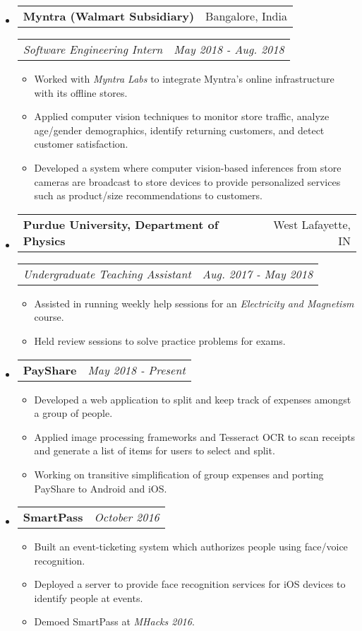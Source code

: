 \documentclass[letterpaper, 11pt]{article}
\makeatletter
\newcommand{\resitem}[1]{\item #1 \vspace{-2pt}}
\newcommand{\resheading}[1]{{\large \parashade[.9]{sharpcorners}{\textbf{#1 \vphantom{p\^{E}}}}}}
\newcommand{\ressubheadinga}[2]{
\begin{tabular*}{7.11in}{l@{\extracolsep{\fill}}r}
		\textbf{#1} & #2 \\
\end{tabular*}}
\newcommand{\ressubheadingb}[2]{
\begin{tabular*}{7.11in}{l@{\extracolsep{\fill}}r}
		\textit{#1} & \textit{#2} \\
\end{tabular*}\vspace{-6pt}}
\makeatother
\begin{document}
\begin{itemize}
\item
	\ressubheadinga{Myntra (Walmart Subsidiary)}{Bangalore, India}
	\ressubheadingb{Software Engineering Intern}{May 2018 - Aug. 2018}
	\begin{itemize}
        \resitem{Worked with \emph{Myntra Labs} to integrate Myntra's online infrastructure with its offline stores.}
		\resitem{Applied computer vision techniques to monitor store traffic, analyze age/gender demographics, identify returning customers, and detect customer satisfaction.}
		\resitem{Developed a system where computer vision-based inferences from store cameras are broadcast to store devices to provide personalized services such as product/size recommendations to customers.}
	\end{itemize}
\end{itemize}

\begin{itemize}
\item
    \ressubheadinga{Purdue University, Department of Physics}{West Lafayette, IN}
    \ressubheadingb{Undergraduate Teaching Assistant}{Aug. 2017 - May 2018}
    \begin{itemize}
        \resitem{Assisted in running weekly help sessions for an \textit{Electricity and Magnetism} course.}
        \resitem{Held review sessions to solve practice problems for exams.}
    \end{itemize}
\end{itemize}

\vspace{-0.16in}
\resheading{Projects}
\vspace{-0.235in}

\begin{itemize}
\item
    \ressubheadinga{PayShare}{\emph{May 2018 - Present}}
    \vspace{-0.25in}
    \begin{itemize}
        \resitem{Developed a web application to split and keep track of expenses amongst a group of people.}
        \resitem{Applied image processing frameworks and Tesseract OCR to scan receipts and generate a list of items for users to select and split.}
        \resitem{Working on transitive simplification of group expenses and porting PayShare to Android and iOS.}
    \end{itemize}

\item
    \ressubheadinga{SmartPass}{\emph{October 2016}}
    \vspace{-0.25in}
    \begin{itemize}
        \resitem{Built an event-ticketing system which authorizes people using face/voice recognition.}
        \resitem{Deployed a server to provide face recognition services for iOS devices to identify people at events.}
        \resitem{Demoed SmartPass at \textit{MHacks 2016}.}
    \end{itemize}
\end{itemize}
\end{document}
